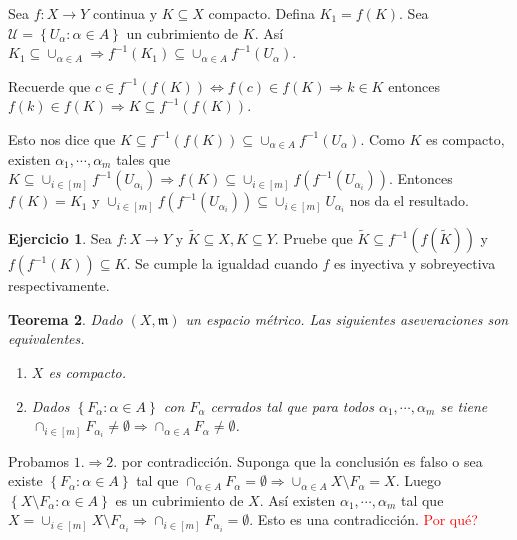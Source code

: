 \documentclass[12pt]{article}
\theoremstyle{plain}
\newtheorem{Th}{Teorema}[subsection]   %
\theoremstyle{definition}
\newtheorem{Ej}[Th]{Ejercicio}
\theoremstyle{remark}
\numberwithin{equation}{section}
\newcommand{\mm}{\mathfrak{m}}      %
\newcommand{\cU}{\mathcal{U}}       %
\renewcommand{\:}{\colon}           %
\newcommand{\conj}[1]{\left\lbrace#1\right\rbrace}
\newcommand{\bonj}[1]{\left\lbrack#1\right\rbrack}
\begin{document}
\begin{multicols}{2}
\begin{ptcbp}
Sea $f\colon X\to Y$ continua y $K\subseteq X$ compacto. Defina $K_1=f(K)$. Sea $\cU=\conj{U_\alpha\colon\alpha\in A}$ un cubrimiento de $K$. Así $K_1\subseteq\cup_{\alpha\in A}\Rightarrow f^{-1}(K_1)\subseteq\cup_{\alpha\in A}f^{-1}(U_\alpha)$. \par
\begin{ptcb}
Recuerde que $c\in f^{-1}(f(K))\iff f(c)\in f(K)\Rightarrow k\in K$ entonces $f(k)\in f(K)\Rightarrow K\subseteq f^{-1}(f(K))$.
\end{ptcb}
Esto nos dice que $K\subseteq f^{-1}(f(K))\subseteq\cup_{\alpha\in A}f^{-1}(U_\alpha)$. Como $K$ es compacto, existen $\alpha_1,\cdots,\alpha_{m}$ tales que $K\subseteq\cup_{i\in\bonj{m}}f^{-1}(U_{\alpha_i})\Rightarrow f(K)\subseteq\cup_{i\in\bonj{m}}f(f^{-1}(U_{\alpha_i}))$. Entonces $f(K)=K_1$ y $\cup_{i\in\bonj{m}}f(f^{-1}(U_{\alpha_i}))\subseteq\cup_{i\in\bonj{m}}U_{\alpha_i}$ nos da el resultado.
\end{ptcbp}
\begin{Ej}
  Sea $f\colon X\to Y$ y $\tilde{K}\subseteq X, K\subseteq Y$. Pruebe que $\tilde{K}\subseteq f^{-1}(f(\tilde{K}))$ y $f(f^{-1}(K))\subseteq K$. Se cumple la igualdad cuando $f$ es inyectiva y sobreyectiva respectivamente.
\end{Ej}
\begin{Th}\label{thm:intervalosEncajados}
  Dado $(X,\mm)$ un espacio métrico. Las siguientes aseveraciones son equivalentes.
  \begin{enumerate}
    \item $X$ es compacto.
    \item Dados $\conj{F_{\alpha}\colon\alpha\in A}$ con $F_\alpha$ cerrados tal que para todos $\alpha_1,\cdots,\alpha_m$ se tiene $\cap_{i\in\bonj{m}}F_{\alpha_i}\neq\emptyset\Rightarrow\cap_{\alpha\in A}F_{\alpha}\neq\emptyset$.
  \end{enumerate}
\end{Th}

\begin{ptcbp}
Probamos $\mathit{1}.\Rightarrow\mathit{2.}$ por contradicción. Suponga que la conclusión es falso o sea existe $\conj{F_\alpha\colon\alpha\in A}$ tal que $\cap_{\alpha\in A}F_\alpha=\emptyset\Rightarrow\cup_{\alpha\in A}X\setminus F_\alpha= X$. Luego $\conj{X\setminus F_\alpha\colon\alpha\in A}$ es un cubrimiento de $X$. Así existen $\alpha_1,\cdots,\alpha_m$ tal que $X=\cup_{i\in\bonj{m}}X\setminus F_{\alpha_i}\Rightarrow\cap_{i\in\bonj{m}}F_{\alpha_i}=\emptyset$. Esto es una contradicción. \textcolor{red}{Por qué?}
\end{ptcbp}


\end{multicols}
\end{document}
